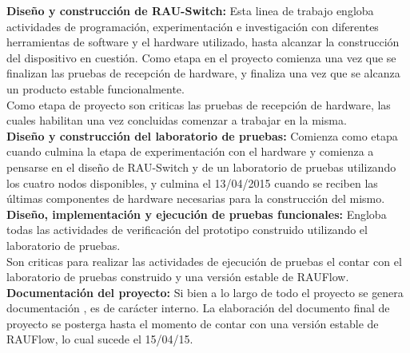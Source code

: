 \textbf{Diseño y construcci\'on de RAU-Switch:} Esta linea de trabajo engloba actividades de programaci\'on, experimentaci\'on e investigaci\'on con diferentes herramientas de software y el hardware utilizado, hasta alcanzar la construcci\'on del dispositivo en cuesti\'on. Como etapa en el proyecto comienza una vez que se finalizan las pruebas de recepci\'on de hardware, y finaliza una vez que se alcanza un producto estable funcionalmente.\\

Como etapa de proyecto son criticas las pruebas de recepci\'on de hardware, las cuales habilitan una vez concluidas comenzar a trabajar en la misma.\\

\textbf{Diseño y construcci\'on del laboratorio de pruebas:} Comienza como etapa cuando culmina la etapa de experimentaci\'on con el hardware y comienza a pensarse en el diseño de RAU-Switch y de un laboratorio de pruebas utilizando los cuatro nodos disponibles, y culmina el 13/04/2015 cuando se reciben las \'ultimas componentes de hardware necesarias para la construcci\'on del mismo.\\

\textbf{Diseño, implementaci\'on y ejecuci\'on de pruebas funcionales:} Engloba todas las actividades de verificaci\'on del prototipo construido utilizando el laboratorio de pruebas.\\

Son criticas para realizar las actividades de ejecuci\'on de pruebas el contar con el laboratorio de pruebas construido y una versi\'on estable de RAUFlow.\\

\textbf{Documentaci\'on del proyecto:} Si bien a lo largo de todo el proyecto se genera documentaci\'on  , es de carácter interno. La elaboraci\'on del documento final de proyecto se posterga hasta el momento de contar con una versi\'on estable de RAUFlow, lo cual sucede el 15/04/15.